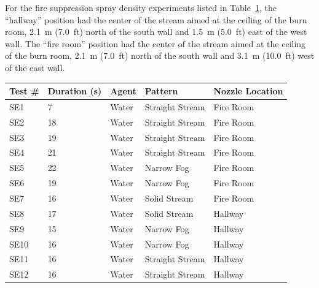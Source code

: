 \documentclass[12pt,oneside]{book}
\begin{document}
For the fire suppression spray density experiments listed in Table~\ref{tab:spray_density_tests2}, the ``hallway'' position had the center of the stream aimed at the ceiling of the burn room, 2.1~m (7.0~ft) north of the south wall and 1.5~m (5.0~ft) east of the west wall. The ``fire room'' position had the center of the stream aimed at the ceiling of the burn room, 2.1~m (7.0~ft) north of the south wall and 3.1~m (10.0~ft) west of the east wall.

\begin{table}[!ht]
\footnotesize
\centering
{}\label{tab:spray_density_tests2}
\begin{tabular}{lllll}
\toprule[1.5pt]
Test \#    & Duration (s)  & Agent  &  Pattern            & Nozzle Location  	\\
\midrule
SE1        & 7             & Water  &  Straight Stream    &    Fire Room          \\
SE2        & 18            & Water  &  Straight Stream    &    Fire Room          \\
SE3        & 19            & Water  &  Straight Stream    &    Fire Room          \\
SE4        & 21            & Water  &  Straight Stream    &    Fire Room          \\
SE5        & 22            & Water  &  Narrow Fog  		  &    Fire Room          \\
SE6        & 19            & Water  &  Narrow Fog   	  &    Fire Room          \\
SE7        & 16            & Water  &  Solid Stream       &    Fire Room          \\
SE8        & 17            & Water  &  Solid Stream       &    Hallway            \\
SE9        & 15            & Water  &  Narrow Fog   	  &    Hallway            \\
SE10       & 16            & Water  &  Narrow Fog   	  &    Hallway            \\
SE11       & 16            & Water  &  Straight Stream    &    Hallway            \\
SE12       & 16            & Water  &  Straight Stream    &    Hallway            \\
\bottomrule[1.25pt]
\end{tabular}\par
\end{table}

\clearpage
\end{document}
